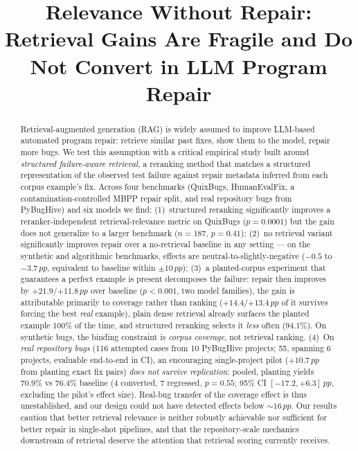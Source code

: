 \documentclass[10pt,conference,a4paper]{IEEEtran}
\newcommand{\pp}{\,pp}
\begin{document}
\title{Relevance Without Repair: Retrieval Gains Are Fragile and Do Not
  Convert in LLM Program Repair}

\author{
}

\maketitle

\begin{abstract}
Retrieval-augmented generation (RAG) is widely assumed to improve LLM-based
automated program repair: retrieve similar past fixes, show them to the
model, repair more bugs. We test this assumption with a critical empirical
study built around \emph{structured failure-aware retrieval}, a reranking
method that matches a structured representation of the observed test failure
against repair metadata inferred from each corpus example's fix. Across four
benchmarks (QuixBugs, HumanEvalFix, a contamination-controlled MBPP repair
split, and real repository bugs from PyBugHive) and six models we find:
(1)~structured reranking significantly improves a reranker-independent
retrieval-relevance metric on QuixBugs ($p{=}0.0001$) but the gain does not
generalize to a larger benchmark ($n{=}187$, $p{=}0.41$); (2)~no retrieval
variant significantly improves repair over a no-retrieval baseline in any
setting --- on the synthetic and algorithmic benchmarks, effects are
neutral-to-slightly-negative ($-0.5$ to $-3.7\pp$, equivalent to baseline
within $\pm 10\pp$); (3)~a planted-corpus experiment that guarantees a
perfect example is present decomposes the failure: repair then improves by
$+21.9$/$+11.8\pp$ over baseline ($p{<}0.001$, two model families), the
gain is attributable primarily to coverage rather than ranking
($+14.4$/$+13.4\pp$ of it survives forcing the best \emph{real} example),
plain dense retrieval already surfaces the planted example 100\% of the
time, and structured reranking selects it \emph{less} often (94.1\%).
On synthetic bugs, the binding constraint is \emph{corpus coverage}, not
retrieval ranking. (4)~On \emph{real repository bugs} (116 attempted cases
from 10 PyBugHive projects; 55, spanning 6 projects, evaluable end-to-end
in CI), an encouraging single-project pilot ($+10.7\pp$ from planting exact
fix pairs) \emph{does not survive replication}: pooled, planting yields
$70.9\%$ vs $76.4\%$ baseline (4 converted, 7 regressed, $p{=}0.55$; 95\%
CI $[-17.2, +6.3]\pp$, excluding the pilot's effect size). Real-bug
transfer of the coverage effect is thus unestablished, and our design
could not have detected effects below ${\sim}16\pp$. Our results caution
that better retrieval relevance is neither robustly achievable nor
sufficient for better repair in single-shot pipelines, and that the
repository-scale mechanics downstream of retrieval deserve the attention
that retrieval scoring currently receives.
\end{abstract}
\end{document}
